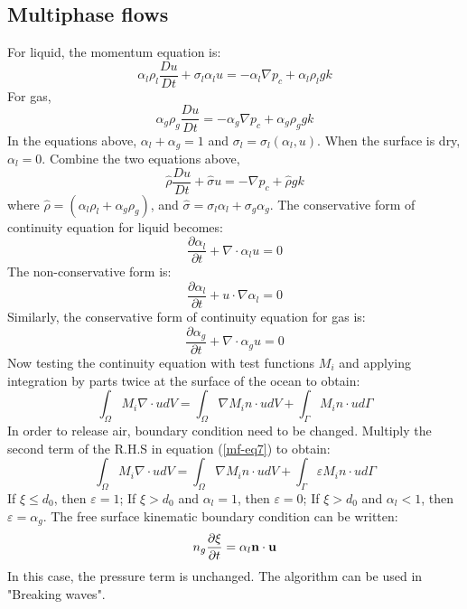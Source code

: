 \subsection{Multiphase flows}
\noindent
For liquid, the momentum equation is:
\begin{equation}
\alpha_l\rho_l\dfrac{Du}{Dt} + \sigma_l\alpha_l u = - \alpha_l\nabla p_c + \alpha_l\rho_l g k
\label{mf-eq1}
\end{equation}
For gas,
\begin{equation}
\alpha_g\rho_g\dfrac{Du}{Dt} = - \alpha_g\nabla p_c + \alpha_g\rho_ggk
\label{mf-eq2}
\end{equation}
In the equations above, $ \alpha_l + \alpha_g =1$ and $\sigma_l=\sigma_l(\alpha_l,u)$. When the surface is dry, $\alpha_l = 0$. Combine the two equations above,
\begin{equation}
\hat \rho \dfrac{Du}{Dt} + \hat \sigma u = -\nabla p_c+\hat \rho g k
\label{mf-eq3}
\end{equation}
where $\hat \rho=(\alpha_l\rho_l + \alpha_g\rho_g)$, and $\hat\sigma=\sigma_l\alpha_l +\sigma_g\alpha_g $.
The conservative form of continuity equation for liquid becomes:
\begin{equation}
\frac{\partial \alpha_l}{\partial t} + \nabla \cdot \alpha_l u = 0
\label{mf-eq4}
\end{equation}
The non-conservative form is:
\begin{equation}
\frac{\partial \alpha_l}{\partial t} + u \cdot \nabla \alpha_l = 0
\label{mf-eq5}
\end{equation}
Similarly, the conservative form of continuity equation for gas is:
\begin{equation}
\frac{\partial \alpha_g}{\partial t} + \nabla \cdot \alpha_g u = 0
\label{mf-eq6}
\end{equation}
Now testing the continuity equation with test functions $M_i$ and applying integration by parts twice at the
surface of the ocean to obtain:
\begin{equation}
\int_\Omega M_i \nabla \cdot u dV = \int_\Omega \nabla M_i n \cdot u dV + \int_\Gamma M_i n \cdot u d\Gamma
\label{mf-eq7}
\end{equation}
In order to release air, boundary condition need to be changed. Multiply the second term of the R.H.S in
equation (\ref{mf-eq7}) to obtain:
\begin{equation}
\int_\Omega M_i \nabla \cdot u dV = \int_\Omega \nabla M_i n \cdot u dV +
 \int_\Gamma \varepsilon M_i n \cdot u d\Gamma
\label{mf-eq8}
\end{equation}
If $\xi \leq d_0$, then $\varepsilon = 1$;
If $\xi > d_0$ and $\alpha_l = 1$, then $\varepsilon = 0$;
If $\xi > d_0$ and $\alpha_l < 1$, then $\varepsilon = \alpha_g$.
The free surface kinematic boundary condition can be written:
\begin{equation}
n_g\frac {\partial \xi}{\partial t} = \alpha_l {\bf n} \cdot {\bf u}
\label{mf-eq9}
\end{equation}
In this case, the pressure term is unchanged. The algorithm can be used in "Breaking waves".




